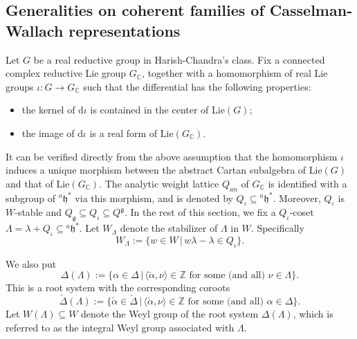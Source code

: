 \documentclass[12pt, a4paper]{amsart}
\numberwithin{equation}{section}
\newcommand{\BC}{{\mathbb {C}}}
\newcommand{\BZ}{{\mathbb {Z}}}
\newcommand{\fg}{\mathfrak{g}}
\newcommand{\fh}{\mathfrak{h}}
\newcommand{\Lie}{{\mathrm{Lie}}}
\newcommand{\set}[2]{\{#1\,|\,#2\}}
\begin{document}
\subsection{Generalities on coherent families of Casselman-Wallach representations}\label{2.1}
Let $G$ be a real reductive group in Harish-Chandra's class. Fix a connected complex reductive Lie group $G_\BC$, together with a homomorphism of real Lie groups $\iota: G \to G_\BC$ such that the differential has the following properties:
\begin{itemize}
   \item the kernel of $\mathrm{d}\iota$ is contained in the center of $\mathrm{Lie}(G)$;
   \item the image of $\mathrm{d}\iota$ is a real form of $\mathrm{Lie}(G_\BC)$.
\end{itemize}
It can be verified directly from the above assumption that the homomorphism $\iota$ induces a unique morphism between the abstract Cartan subalgebra of $\Lie(G)$ and that of $\Lie(G_{\BC})$. The analytic weight lattice $Q_{an}$ of $G_\BC$ is identified with a subgroup of ${^{a}\fh^*}$ via this morphism, and is denoted by $Q_{\iota} \subseteq  {^{a}\fh^*}$. Moreover, $Q_{\iota}$ is $W$-stable and $Q_{\fg} \subseteq Q_{\iota} \subseteq Q^{\fg}$. In the rest of this section, we fix a $Q_{\iota}$-coset $\Lambda = \lambda + Q_{\iota} \subseteq {^a\fh^*}$. Let $W_{\Lambda}$ denote the stabilizer of $\Lambda$ in $W$. Specifically 
$$W_{\Lambda} := \set{w \in W}{w\lambda - \lambda \in Q_{\iota}}.$$

We also put 
\begin{equation}
    \Delta(\Lambda) := \set{\alpha \in \Delta}{\textrm{$\langle \check{\alpha} , \nu \rangle \in \BZ$ for some (and all) $\nu \in \Lambda$}}.
\end{equation}
This is a root system with the corresponding coroots 
\begin{equation}
    \check{\Delta}(\Lambda) := \set{\check{\alpha} \in \check{\Delta}}{\textrm{$\langle \check{\alpha}, \nu \rangle \in \BZ$ for some (and all) $\alpha \in \Delta$}}.
\end{equation}
Let $W(\Lambda) \subseteq W$ denote the Weyl group of the root system $\Delta(\Lambda)$, which is referred to as the integral Weyl group associated with $\Lambda$.
\end{document}
